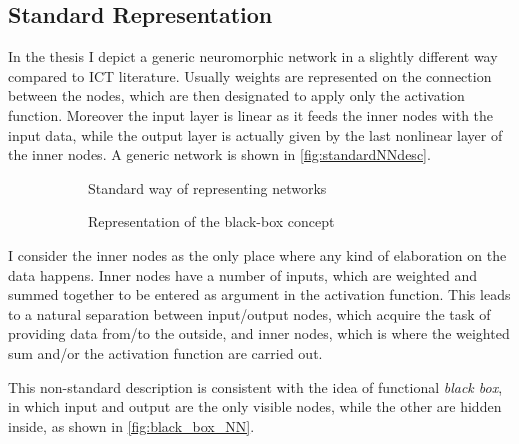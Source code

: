 \subsection*{Standard Representation}
In the thesis I depict a generic neuromorphic network in a slightly different way compared to ICT literature.
Usually weights are represented on the connection between the nodes, which are then designated to apply only the activation function.
Moreover the input layer is linear as it feeds the inner nodes with the input data, while the output layer is actually given by the last nonlinear layer of the inner nodes.
A generic network is shown in \autoref{fig:standardNNdesc}.

\begin{figure}[ht]
	\begin{subfigure}[b]{0.49\textwidth}
		\centering
		
		\caption{Standard way of representing networks}
		\label{fig:standardNNdesc}
  \end{subfigure}
  \begin{subfigure}[b]{0.49\textwidth}
  		\centering
		
		\caption{Representation of the black-box concept}
		\label{fig:black_box_NN}
  \end{subfigure}
  \caption{}
  	\label{fig:description_comparison}
\end{figure}

I consider the inner nodes as the only place where any kind of elaboration on the data happens.
Inner nodes have a number of inputs, which are weighted and summed together to be entered as argument in the activation function.
This leads to a natural separation between input/output nodes, which acquire the task of providing data from/to the outside, and inner nodes, which is where the weighted sum and/or the activation function are carried out.

This non-standard description is consistent with the idea of functional \textit{black box}, in which input and output are the only visible nodes, while the other are hidden inside, as shown in \autoref{fig:black_box_NN}.

